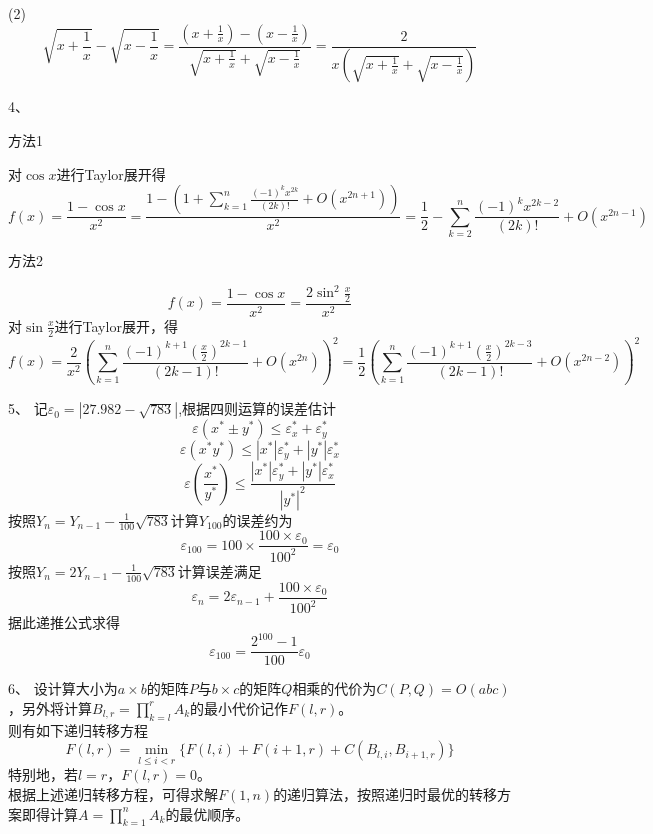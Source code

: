 \documentclass[12pt, a4paper]{article}
\theoremstyle{margin}
\begin{document}
(2)
$$\sqrt{x+\frac{1}{x}}-\sqrt{x-\frac{1}{x}}=\frac{\left(x+\frac{1}{x}\right)-\left(x-\frac{1}{x}\right)}{\sqrt{x+\frac{1}{x}}+\sqrt{x-\frac{1}{x}}}=\frac{2}{x\left(\sqrt{x+\frac{1}{x}}+\sqrt{x-\frac{1}{x}}\right)}$$
\newline

4、

方法1 

对$\cos x$进行Taylor展开得
$$f\left(x\right)=\frac{1-\cos x}{x^2}=\frac{1-\left(1+\sum_{k=1}^{n}\frac{\left(-1\right)^{k}x^{2k}}{\left(2k\right)!}+O\left(x^{2n+1}\right)\right)}{x^2}=\frac{1}{2}-\sum_{k=2}^{n}\frac{\left(-1\right)^{k}x^{2k-2}}{\left(2k\right)!}+O\left(x^{2n-1}\right)$$

方法2

$$f\left(x\right)=\frac{1-\cos x}{x^2}=\frac{2\sin^2 \frac{x}{2}}{x^2}$$
对$\sin \frac{x}{2}$进行Taylor展开，得
$$f\left(x\right)=\frac{2}{x^2}\left(\sum_{k=1}^{n}\frac{\left(-1\right)^{k+1}\left(\frac{x}{2}\right)^{2k-1}}{\left(2k-1\right)!}+O\left(x^{2n}\right)\right)^2=\frac{1}{2}\left(\sum_{k=1}^{n}\frac{\left(-1\right)^{k+1}\left(\frac{x}{2}\right)^{2k-3}}{\left(2k-1\right)!}+O\left(x^{2n-2}\right)\right)^2$$
\newline

5、 记$\varepsilon_0=|27.982-\sqrt{783}|$,根据四则运算的误差估计
$$\varepsilon \left(x^{\ast}\pm y^{\ast}\right)\leq \varepsilon_x^{\ast}+\varepsilon_y^{\ast}$$
$$\varepsilon \left(x^{\ast}y^{\ast}\right)\leq |x^{\ast}|\varepsilon_y^{\ast}+|y^{\ast}|\varepsilon_x^{\ast}$$
$$\varepsilon \left(\frac{x^{\ast}}{y^{\ast}}\right)\leq \frac{|x^{\ast}|\varepsilon_y^{\ast}+|y^{\ast}|\varepsilon_x^{\ast}}{|y^{\ast}|^2}$$
按照$Y_n=Y_{n-1}-\frac{1}{100}\sqrt{783}$计算$Y_{100}$的误差约为
$$\varepsilon_{100}=100\times \frac{100\times \varepsilon_0}{100^2}=\varepsilon_0$$
按照$Y_n=2Y_{n-1}-\frac{1}{100}\sqrt{783}$计算误差满足
$$\varepsilon_n=2\varepsilon_{n-1}+\frac{100\times \varepsilon_0}{100^2}$$
据此递推公式求得
$$\varepsilon_{100}= \frac{2^{100}-1}{100}\varepsilon_0$$
\newline

6、 设计算大小为$a\times b$的矩阵$P$与$b\times c$的矩阵$Q$相乘的代价为$C\left(P, Q\right)=O\left(abc\right)$，另外将计算$B_{l,r}=\prod_{k=l}^{r}A_k$的最小代价记作$F\left(l,r\right)$。 \\
则有如下递归转移方程
$$F\left(l,r\right)=\min_{l\leq i<r}\{F\left(l,i\right)+F\left(i+1,r\right)+C\left(B_{l,i},B_{i+1,r}\right)\}$$
特别地，若$l=r$，$F\left(l,r\right)=0$。\\
根据上述递归转移方程，可得求解$F\left(1,n\right)$的递归算法，按照递归时最优的转移方案即得计算$A=\prod_{k=1}^{n}A_k$的最优顺序。
\end{document}
